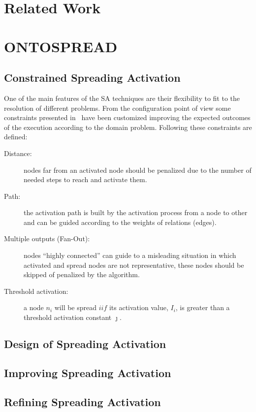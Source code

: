 \documentclass{llncs}
\begin{document}
\section{Related Work}
\section{ONTOSPREAD}
\subsection{Constrained Spreading Activation}
One of the main features of the SA techniques are their flexibility to fit to 
the resolution of different problems. From the configuration point of view
some constraints presented in~\cite{Cohen1987} have been customized improving
the expected outcomes of the execution according to the domain problem. Following these
constraints are defined:

\begin{description}

\item [Distance:] nodes far from an activated node should be penalized due to
the number of needed steps to reach and activate them.

\item [Path:] the activation path is built by the activation process from a node
to other and can be guided according to the weights of relations (edges). 

\item [Multiple outputs (Fan-Out):] nodes ``highly connected'' can 
guide to a misleading situation in which activated and spread nodes are not representative, these nodes
should be skipped of penalized by the algorithm.


\item [Threshold activation:] a node $n_i$ will be spread $iif$ its activation
value, $I_i$, is greater than a threshold activation constant $\jmath$.

\end{description}

\subsection{Design of Spreading Activation}\label{impl-sa}
\subsection{Improving Spreading Activation}\label{improve:sa}
\subsection{Refining Spreading Activation}
\end{document}
